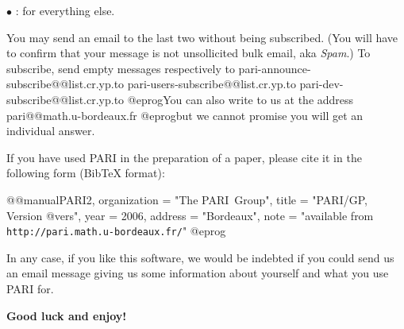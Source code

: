  $\bullet$ : for everything else.

\noindent You may send an email to the last two without being subscribed.
(You will have to confirm that your message is not unsollicited bulk email,
aka \emph{Spam}.) To subscribe, send empty messages respectively to
\def\@{@}
\bprog
  pari-announce-subscribe@@list.cr.yp.to
     pari-users-subscribe@@list.cr.yp.to
       pari-dev-subscribe@@list.cr.yp.to
@eprog\noindent You can also write to us at the address
\bprog
  pari@@math.u-bordeaux.fr
@eprog\noindent but we cannot promise you will get an individual answer.
\smallskip

If you have used PARI in the preparation of a paper, please cite it in the
following form (BibTeX format):

\bprog
@@manual{PARI2,
    organization = "{The PARI~Group}",
    title        = "{PARI/GP, Version @vers}",
    year         = 2006,
    address      = "Bordeaux",
    note         = "available from {\tt http://pari.math.u-bordeaux.fr/}"
}
@eprog
\smallskip

\noindent In any case, if you like this software, we would be indebted if you
could send us an email message giving us some information about yourself and
what you use PARI for.

\medskip
{\bf Good luck and enjoy!}
\vfill\eject
